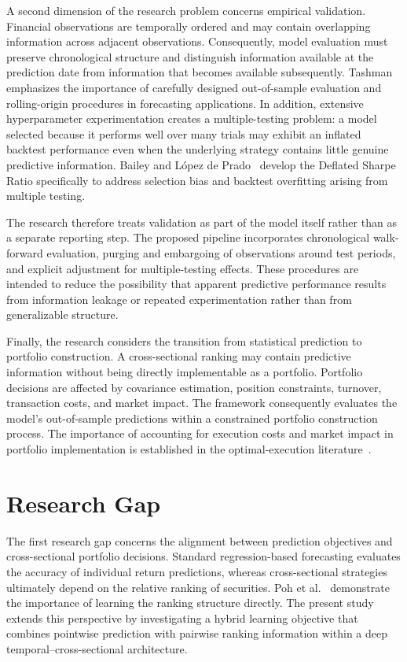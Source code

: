 A second dimension of the research problem concerns empirical validation. Financial observations are temporally ordered and may contain overlapping information across adjacent observations. Consequently, model evaluation must preserve chronological structure and distinguish information available at the prediction date from information that becomes available subsequently. Tashman~\cite{Tashman2000} emphasizes the importance of carefully designed out-of-sample evaluation and rolling-origin procedures in forecasting applications. In addition, extensive hyperparameter experimentation creates a multiple-testing problem: a model selected because it performs well over many trials may exhibit an inflated backtest performance even when the underlying strategy contains little genuine predictive information. Bailey and López de Prado~\cite{BaileyLopezDePrado2014} develop the Deflated Sharpe Ratio specifically to address selection bias and backtest overfitting arising from multiple testing.

\medskip

The research therefore treats validation as part of the model itself rather than as a separate reporting step. The proposed pipeline incorporates chronological walk-forward evaluation, purging and embargoing of observations around test periods, and explicit adjustment for multiple-testing effects. These procedures are intended to reduce the possibility that apparent predictive performance results from information leakage or repeated experimentation rather than from generalizable structure.

\medskip

Finally, the research considers the transition from statistical prediction to portfolio construction. A cross-sectional ranking may contain predictive information without being directly implementable as a portfolio. Portfolio decisions are affected by covariance estimation, position constraints, turnover, transaction costs, and market impact. The framework consequently evaluates the model's out-of-sample predictions within a constrained portfolio construction process. The importance of accounting for execution costs and market impact in portfolio implementation is established in the optimal-execution literature~\cite{AlmgrenChriss2000}.

\section{Research Gap}
The first research gap concerns the alignment between prediction objectives and cross-sectional portfolio decisions. Standard regression-based forecasting evaluates the accuracy of individual return predictions, whereas cross-sectional strategies ultimately depend on the relative ranking of securities. Poh et al.~\cite{Poh2021} demonstrate the importance of learning the ranking structure directly. The present study extends this perspective by investigating a hybrid learning objective that combines pointwise prediction with pairwise ranking information within a deep temporal--cross-sectional architecture.

